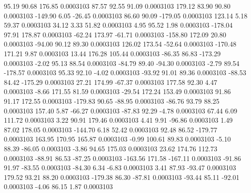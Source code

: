        95.19       90.68      176.85     0.0003103
       87.57       92.55       91.09     0.0003103
      179.12       83.90       90.80     0.0003103
     -149.90        6.05      -26.45     0.0003103
       86.60       90.09     -179.05     0.0003103
      123.14        5.18       59.37     0.0003103
       34.12        3.33       51.82     0.0003103
        4.95       95.52        1.98     0.0003103
     -178.04       97.91      178.87     0.0003103
      -62.24      173.97      -61.71     0.0003103
     -158.80      172.09       20.80     0.0003103
      -94.00       90.12       89.30     0.0003103
      126.02      173.54      -52.64     0.0003103
     -170.48      171.21        9.87     0.0003103
       13.44      176.28      105.44     0.0003103
      -86.35       86.83     -173.29     0.0003103
       -2.02       95.13       88.54     0.0003103
      -84.79       89.40      -94.30     0.0003103
       -2.79       89.54     -178.57     0.0003103
       95.33       92.10       -4.02     0.0003103
      -93.92       91.01       89.36     0.0003103
      -88.53       84.42     -175.29     0.0003103
       27.21      174.99      -67.37     0.0003103
      177.58       92.30        4.47     0.0003103
       -8.66      171.55       81.59     0.0003103
      -29.54      172.24      153.49     0.0003103
       91.86       91.17      172.55     0.0003103
     -179.83       90.65      -88.95     0.0003103
      -86.76       93.79       88.25     0.0003103
      157.40        5.87      -66.27     0.0003103
      -87.83       92.29       -4.78     0.0003103
       67.44        6.09      111.72     0.0003103
        3.22       90.91      179.46     0.0003103
        4.41        9.91      -96.86     0.0003103
        1.49       87.02      178.05     0.0003103
     -144.70        6.18       52.42     0.0003103
       92.48       86.52     -179.77     0.0003103
      163.95      170.95      165.87     0.0003103
       -0.99      100.61       89.83     0.0003103
       -5.10       88.39      -86.05     0.0003103
       -3.86       94.65      175.03     0.0003103
       23.62      174.76      112.73     0.0003103
      -88.91       86.53      -87.25     0.0003103
     -163.56      171.58     -167.11     0.0003103
      -91.86       91.97      -83.55     0.0003103
      -84.30        6.34       -6.83     0.0003103
        3.41       87.93      -93.47     0.0003103
      179.52       93.21       88.20     0.0003103
     -179.38       86.30      -87.81     0.0003103
      -93.44       85.11      -92.01     0.0003103
       -4.06       86.15        1.87     0.0003103

